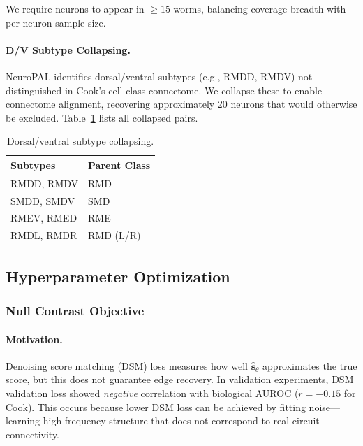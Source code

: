 \documentclass{article}
\theoremstyle{plain}
\theoremstyle{definition}
\theoremstyle{remark}
\newcommand{\1}{\mathbf{1}}
\begin{document}
We require neurons to appear in $\geq 15$ worms, balancing coverage breadth with per-neuron sample size.

\paragraph{D/V Subtype Collapsing.}
NeuroPAL identifies dorsal/ventral subtypes (e.g., RMDD, RMDV) not distinguished in Cook's cell-class connectome. We collapse these to enable connectome alignment, recovering approximately 20 neurons that would otherwise be excluded. Table~\ref{tab:dv_collapse} lists all collapsed pairs.

\begin{table}[h!]
\centering
\caption{Dorsal/ventral subtype collapsing.}
\label{tab:dv_collapse}
\begin{small}
\begin{tabular}{ll}
\toprule
\textbf{Subtypes} & \textbf{Parent Class} \\
\midrule
RMDD, RMDV & RMD \\
SMDD, SMDV & SMD \\
RMEV, RMED & RME \\
RMDL, RMDR & RMD (L/R) \\
\bottomrule
\end{tabular}
\end{small}
\end{table}

\subsection{Hyperparameter Optimization}
\label{app:hp_optimization}

\subsubsection{Null Contrast Objective}

\paragraph{Motivation.}
Denoising score matching (DSM) loss measures how well $\widehat{\bm{s}}_\theta$ approximates the true score, but this does not guarantee edge recovery. In validation experiments, DSM validation loss showed \emph{negative} correlation with biological AUROC ($r = -0.15$ for Cook). This occurs because lower DSM loss can be achieved by fitting noise---learning high-frequency structure that does not correspond to real circuit connectivity.
\end{document}
